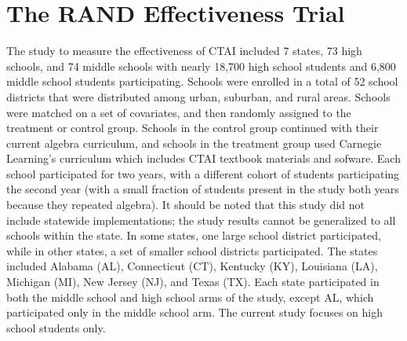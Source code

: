 \documentclass[12pt]{article}\usepackage[]{graphicx}\usepackage[]{color}
\begin{document}
\section{The RAND Effectiveness Trial}\label{sec:RANDtrial}
The study to measure the effectiveness of CTAI included 7 states, 73
high schools, and 74 middle schools with nearly 18,700 high school
students and 6,800 middle school students participating. Schools were enrolled in a
total of 52 school districts that were distributed among urban,
suburban, and rural areas. Schools were matched on a set of
covariates, and then randomly assigned to the treatment or control
group. Schools in the control group continued with their current
algebra curriculum, and schools in the treatment group used Carnegie
Learning's curriculum which includes CTAI textbook materials and sofware. Each school participated for two years, with a different cohort
of students participating the second year (with a small fraction of
students present in the study both years because they repeated
algebra). It should be noted that this study did not include statewide
implementations; the study results cannot be generalized to all
schools within the state. In some states, one large school district
participated, while in other states, a set of smaller school districts
participated. The states included Alabama (AL), Connecticut (CT),
Kentucky (KY), Louisiana (LA), Michigan (MI), New Jersey (NJ), and
Texas (TX). Each state participated in both the middle school and high
school arms of the study, except AL, which participated only in the
middle school arm. The current study focuses on high school students
only. %
\end{document}
